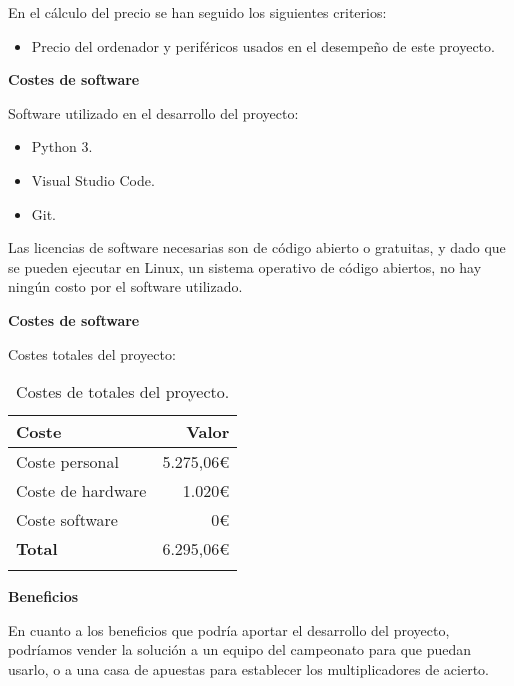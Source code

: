 En el cálculo del precio se han seguido los siguientes criterios:

\begin{itemize}
    \item Precio del ordenador y periféricos usados en el desempeño de este proyecto.
\end{itemize}

\textbf{Costes de software}

Software utilizado en el desarrollo del proyecto:

\begin{itemize}
    \item Python 3.
    \item Visual Studio Code.
    \item Git.
\end{itemize}

Las licencias de software necesarias son de código abierto o gratuitas, y dado que se pueden ejecutar en Linux, un sistema operativo de código abiertos, no hay ningún costo por el software utilizado.

\textbf{Costes de software}

Costes totales del proyecto:

\begin{longtable}[]{@{}lr@{}}
\toprule
\begin{minipage}[b]{0.38\columnwidth}\raggedright\strut
\textbf{Coste}\strut
\end{minipage} & \begin{minipage}[b]{0.20\columnwidth}\raggedright\strut
\textbf{Valor}\strut
\end{minipage}\tabularnewline
\midrule
\endhead
\begin{minipage}[t]{0.38\columnwidth}\raggedright\strut
Coste personal\strut
\end{minipage} & \begin{minipage}[t]{0.20\columnwidth}\raggedright\strut
5.275,06\euro{}\strut
\end{minipage}\tabularnewline
\begin{minipage}[t]{0.38\columnwidth}\raggedright\strut
Coste de hardware\strut
\end{minipage} & \begin{minipage}[t]{0.20\columnwidth}\raggedright\strut
1.020\euro{}\strut
\end{minipage}\tabularnewline
\begin{minipage}[t]{0.38\columnwidth}\raggedright\strut
Coste software\strut
\end{minipage} & \begin{minipage}[t]{0.20\columnwidth}\raggedright\strut
0\euro{}\strut
\end{minipage}\tabularnewline
\midrule
\begin{minipage}[t]{0.38\columnwidth}\raggedright\strut
\textbf{Total}\strut
\end{minipage} & \begin{minipage}[t]{0.20\columnwidth}\raggedright\strut
6.295,06\euro{}\strut
\end{minipage}\tabularnewline
\bottomrule
\caption{Costes de totales del proyecto.}
\end{longtable}

\textbf{Beneficios}

En cuanto a los beneficios que podría aportar el desarrollo del proyecto, podríamos vender la solución a un equipo del campeonato para que puedan usarlo, o a una casa de apuestas para establecer los multiplicadores de acierto.




